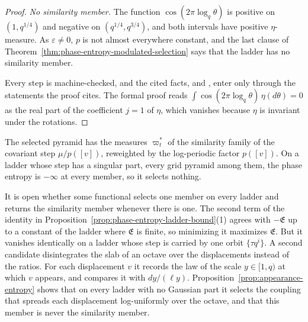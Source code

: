 \begin{proof}
\emph{No similarity member.} The function $\cos(2\pi\log_q\theta)$ is positive on $(1, q^{1/4})$
and negative on $(q^{1/4}, q^{3/4})$, and both intervals have positive $\eta$-measure. As
$\varepsilon \ne 0$, $p$ is not almost everywhere constant, and the last clause of
Theorem~\ref{thm:phase-entropy-modulated-selection} says that the ladder has no similarity member.

Every step is machine-checked, and the cited facts,  and , enter only
through the statements the proof cites. The formal proof reads
$\int\cos(2\pi\log_q\theta)\,\eta(d\theta) = 0$ as the real part of the coefficient $j = 1$ of
$\eta$, which vanishes because $\eta$ is invariant under the rotations.
\end{proof}

The selected pyramid has the
\Levy{} measures $\varpi^*_t$ of the similarity family of the covariant step $\mu/p([v])$, reweighted
by the log-periodic factor $p([v])$. On a ladder whose step has a singular part, every grid
pyramid among them, the phase entropy is $-\infty$ at every member, so it selects nothing.

It is open whether some functional selects one member on every ladder and returns the similarity
member whenever there is one. The second term of the identity in
Proposition~\ref{prop:phase-entropy-ladder-bound}(1) agrees with $-\mathfrak{E}$ up to a constant
of the ladder where $\mathfrak{E}$ is finite, so minimizing it maximizes $\mathfrak{E}$. But it
vanishes identically on a ladder whose step is carried by one orbit $\{\tau q^i\}$. A second candidate disintegrates the slab of an octave over
the displacements instead of the ratios. For each displacement $v$ it records the law of the scale
$y \in [1,q)$ at which $v$ appears, and compares it with $dy/(\ell y)$.
Proposition~\ref{prop:appearance-entropy} shows that on every ladder with no Gaussian part it
selects the coupling that spreads each displacement log-uniformly over the octave, and that this
member is never the similarity member.

